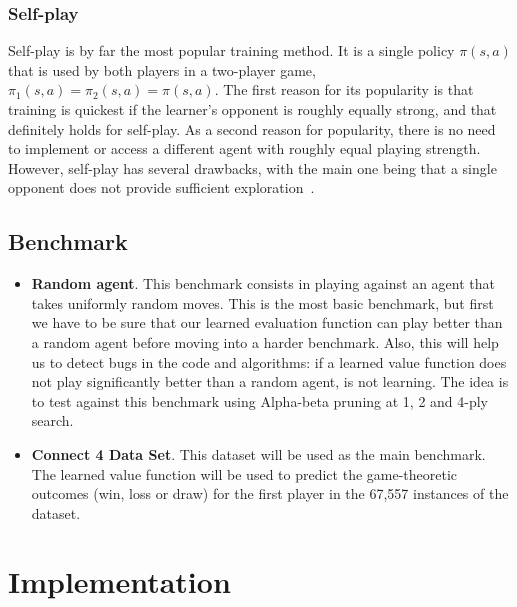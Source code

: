 \documentclass{article}
\begin{document}
\subsubsection{Self-play}

Self-play is by far the most popular training method. It is a single policy $\pi(s,a)$ that is used
by both players in a two-player game, $\pi_1(s,a) = \pi_2(s,a) = \pi(s,a)$. The first reason for its
popularity is that training is quickest if the learner's opponent is roughly equally strong, and
that definitely holds for self-play. As a second reason for popularity, there is no need to
implement or access a different agent with roughly equal playing strength. However, self-play has
several drawbacks, with the main one being that a single opponent does not provide sufficient
exploration~\citep{Szita2011RLGames}.

\subsection{Benchmark}
\label{sec:benchmark}

\begin{itemize}

    \item \textbf{Random agent}. This benchmark consists in playing against an agent that takes
        uniformly random moves. This is the most basic benchmark, but first we have to be sure that
        our learned evaluation function can play better than a random agent before moving into a
        harder benchmark. Also, this will help us to detect bugs in the code and algorithms: if a
        learned value function does not play significantly better than a random agent, is not
        learning. The idea is to test against this benchmark using Alpha-beta pruning at 1, 2 and
        4-ply search.

    \item \textbf{Connect 4 Data Set}. This dataset will be used as the main benchmark. The learned
        value function will be used to predict the game-theoretic outcomes (win, loss or draw) for
        the first player in the 67,557 instances of the dataset.

\end{itemize}

\section{Implementation}
\end{document}

